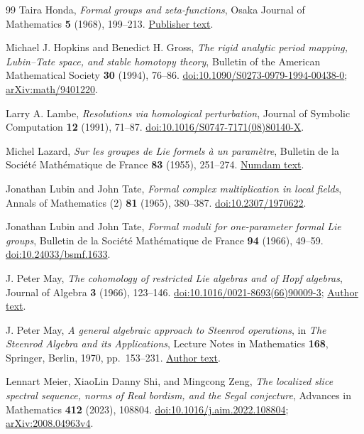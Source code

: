 \begin{thebibliography}{99}
Taira Honda,
\emph{Formal groups and zeta-functions},
Osaka Journal of Mathematics \textbf{5} (1968), 199--213.
\href{https://ir.library.osaka-u.ac.jp/repo/ouka/all/8997/ojm05_02_05.pdf}{Publisher text}.

Michael J. Hopkins and Benedict H. Gross,
\emph{The rigid analytic period mapping, Lubin--Tate space, and stable homotopy theory},
Bulletin of the American Mathematical Society \textbf{30} (1994), 76--86.
\href{https://doi.org/10.1090/S0273-0979-1994-00438-0}{doi:10.1090/S0273-0979-1994-00438-0};
\href{https://arxiv.org/abs/math/9401220}{arXiv:math/9401220}.

Larry A. Lambe,
\emph{Resolutions via homological perturbation},
Journal of Symbolic Computation \textbf{12} (1991), 71--87.
\href{https://doi.org/10.1016/S0747-7171(08)80140-X}{doi:10.1016/S0747-7171(08)80140-X}.

Michel Lazard,
\emph{Sur les groupes de Lie formels \`a un param\`etre},
Bulletin de la Soci\'et\'e Math\'ematique de France \textbf{83} (1955), 251--274.
\href{https://www.numdam.org/article/BSMF_1955__83__251_0.pdf}{Numdam text}.

Jonathan Lubin and John Tate,
\emph{Formal complex multiplication in local fields},
Annals of Mathematics (2) \textbf{81} (1965), 380--387.
\href{https://doi.org/10.2307/1970622}{doi:10.2307/1970622}.

Jonathan Lubin and John Tate,
\emph{Formal moduli for one-parameter formal Lie groups},
Bulletin de la Soci\'et\'e Math\'ematique de France \textbf{94} (1966), 49--59.
\href{https://doi.org/10.24033/bsmf.1633}{doi:10.24033/bsmf.1633}.

J. Peter May,
\emph{The cohomology of restricted Lie algebras and of Hopf algebras},
Journal of Algebra \textbf{3} (1966), 123--146.
\href{https://doi.org/10.1016/0021-8693(66)90009-3}{doi:10.1016/0021-8693(66)90009-3};
\href{https://www.math.uchicago.edu/~may/PAPERS/3.pdf}{Author text}.

J. Peter May,
\emph{A general algebraic approach to Steenrod operations},
in \emph{The Steenrod Algebra and its Applications},
Lecture Notes in Mathematics \textbf{168}, Springer, Berlin, 1970, pp.~153--231.
\href{https://www.math.uchicago.edu/~may/PAPERS/10.pdf}{Author text}.

Lennart Meier, XiaoLin Danny Shi, and Mingcong Zeng,
\emph{The localized slice spectral sequence, norms of Real bordism,
and the Segal conjecture},
Advances in Mathematics \textbf{412} (2023), 108804.
\href{https://doi.org/10.1016/j.aim.2022.108804}{doi:10.1016/j.aim.2022.108804};
\href{https://arxiv.org/abs/2008.04963v4}{arXiv:2008.04963v4}.


\end{thebibliography}
